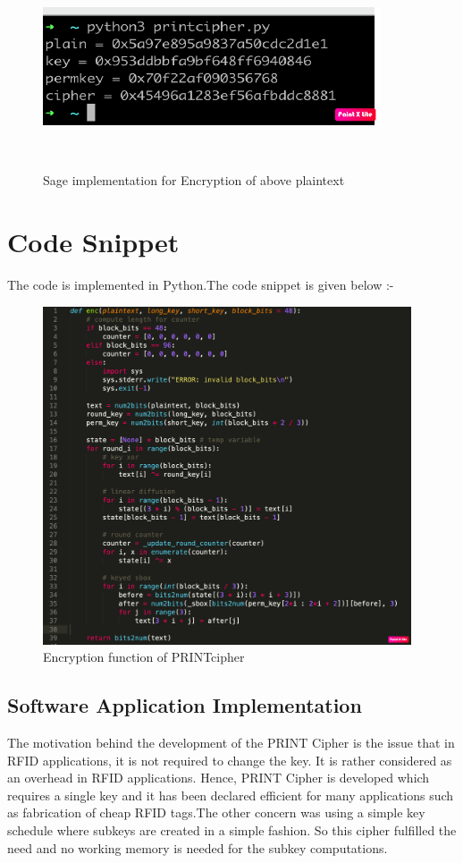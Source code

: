 \documentclass[journal=tosc,preprint]{iacrtrans}
\begin{document}
\begin{figure}[ht]
	\centering
	\includegraphics[height=6cm, width=10cm]{pics/pic_3.png}
	\caption{Sage implementation for Encryption of above plaintext}
\end{figure}


\newpage
\section{Code Snippet}
The code is implemented in Python.The code snippet is given below :-
\begin{figure}
	\centering
	\includegraphics[height=10cm, width=\linewidth]{pics/codesnippet.png}
	\caption{Encryption function of PRINTcipher}
\end{figure}

\newpage
\subsection{Software Application Implementation}  
The motivation behind the development of the PRINT Cipher is the issue that in RFID applications, it is not required to change the key. It is rather considered as an overhead in RFID applications. Hence, PRINT Cipher is developed which requires a single key and it has been declared efficient for many applications such as fabrication of cheap RFID tags.The other concern was using a simple key schedule where subkeys are created in a simple fashion. So this cipher fulfilled the need and no working memory is needed for the subkey computations.
\end{document}
